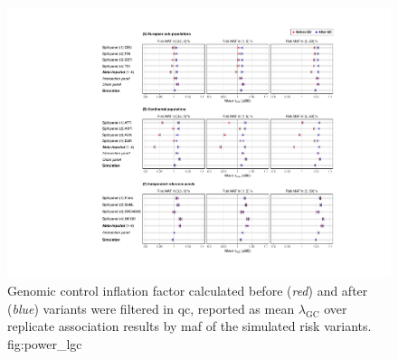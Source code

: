 

\begin{figure}[!htb]
\includegraphics[width=\textwidth]{./img/ch2/association_lambda}
{Genomic control inflation factor calculated before (\emph{red}) and after (\emph{blue}) variants were filtered in \gls{qc}, reported as mean $\lambda_\text{GC}$ over replicate association results by \gls{maf} of the simulated risk variants.}
{fig:power_lgc}
\end{figure}
